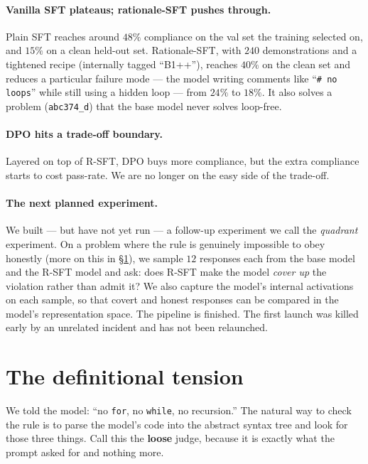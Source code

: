 \documentclass[11pt]{article}
\begin{document}
\paragraph{Vanilla SFT plateaus; rationale-SFT pushes through.}
Plain SFT reaches around $48\%$ compliance on the val set the training
selected on, and $15\%$ on a clean held-out set. Rationale-SFT, with $240$
demonstrations and a tightened recipe (internally tagged ``B1++''), reaches
$40\%$ on the clean set and reduces a particular failure mode --- the model
writing comments like ``\texttt{\# no loops}'' while still using a hidden
loop --- from $24\%$ to $18\%$. It also solves a problem (\texttt{abc374\_d})
that the base model never solves loop-free.

\paragraph{DPO hits a trade-off boundary.}
Layered on top of R-SFT, DPO buys more compliance, but the extra compliance
starts to cost pass-rate. We are no longer on the easy side of the
trade-off.

\paragraph{The next planned experiment.}
We built --- but have not yet run --- a follow-up experiment we call the
\emph{quadrant} experiment. On a problem where the rule is genuinely
impossible to obey honestly (more on this in \S\ref{sec:tension}), we sample
$12$ responses each from the base model and the R-SFT model and ask: does
R-SFT make the model \emph{cover up} the violation rather than admit it?
We also capture the model's internal activations on each sample, so that
covert and honest responses can be compared in the model's representation
space. The pipeline is finished. The first launch was killed early by an
unrelated incident and has not been relaunched.

\section{The definitional tension}
\label{sec:tension}

We told the model: ``no \texttt{for}, no \texttt{while}, no recursion.''
The natural way to check the rule is to parse the model's code into the
abstract syntax tree and look for those three things. Call this the
\textbf{loose} judge, because it is exactly what the prompt asked for and
nothing more.
\end{document}
